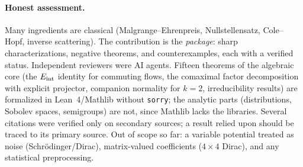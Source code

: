 \paragraph{Honest assessment.} Many ingredients are classical (Malgrange--Ehrenpreis, Nullstellensatz, Cole--Hopf, inverse scattering). The contribution is the \emph{package}: sharp characterizations, negative theorems, and counterexamples, each with a verified status. Independent reviewers were AI agents. Fifteen theorems of the algebraic core (the $E_{\mathrm{int}}$ identity for commuting flows, the comaximal factor decomposition with explicit projector, companion normality for $k=2$, irreducibility results) are formalized in Lean~4/Mathlib without \texttt{sorry}; the analytic parts (distributions, Sobolev spaces, semigroups) are not, since Mathlib lacks the libraries. Several citations were verified only on secondary sources; a result relied upon should be traced to its primary source. Out of scope so far: a variable potential treated as noise (Schr\"odinger/Dirac), matrix-valued coefficients ($4\times4$ Dirac), and any statistical preprocessing.

\clearpage
